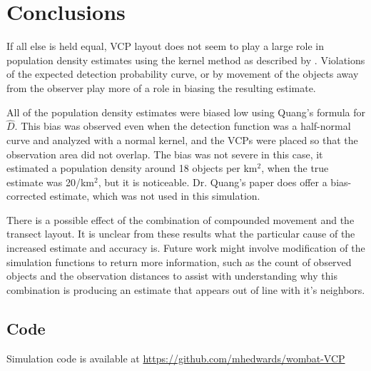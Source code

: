 \documentclass[12pt]{article}
\begin{document}
\section{Conclusions}
If all else is held equal, VCP layout does not seem to play a large role in population density estimates using the kernel method as described by \textcite{quang1993}. Violations of the expected detection probability curve, or by movement of the objects away from the observer play more of a role in biasing the resulting estimate. 

All of the population density estimates were biased low using Quang's formula for $\hat{D}$. This bias was observed even when the detection function was a half-normal curve and analyzed with a normal kernel, and the VCPs were placed so that the observation area did not overlap. The bias was not severe in this case, it estimated a population density around 18 objects per km$^2$, when the true estimate was 20/km$^2$, but it is noticeable. Dr. Quang's paper does offer a bias-corrected estimate, which was not used in this simulation. 

There is a possible effect of the combination of compounded movement and the transect layout. It is unclear from these results what the particular cause of the increased estimate and accuracy is. Future work might involve modification of the simulation functions to return more information, such as the count of observed objects and the observation distances to assist with understanding why this combination is producing an estimate that appears out of line with it's neighbors.



\printbibliography
%
%

\subsection*{Code}
Simulation code is available at \url{https://github.com/mhedwards/wombat-VCP}
\end{document}
